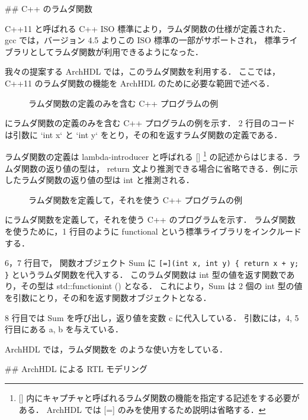 ## C++ のラムダ関数

C++11 と呼ばれる C++ ISO 標準により，ラムダ関数の仕様が定義された．
gcc では，バージョン 4.5 よりこの ISO 標準の一部がサポートされ，
標準ライブラリとしてラムダ関数が利用できるようになった．

我々の提案する ArchHDL では，このラムダ関数を利用する．
ここでは，C++11 のラムダ関数の機能を ArchHDL のために必要な範囲で述べる．

\begin{figure}[t]
 
 \caption{ラムダ関数の定義のみを含む C++ プログラムの例}
 \label{src:def_lambda}
\end{figure}

 にラムダ関数の定義のみを含む C++ プログラムの例を示す．
2 行目のコードは引数に `int x` と `int y` をとり，その和を返すラムダ関数の定義である．

ラムダ関数の定義は lambda-introducer と呼ばれる [] \footnote{
[] 内にキャプチャと呼ばれるラムダ関数の機能を指定する記述をする必要がある．
ArchHDL では [=] のみを使用するため説明は省略する．
}
の記述からはじまる．ラムダ関数の返り値の型は，
return 文より推測できる場合に省略できる．例に示したラムダ関数の返り値の型は
int と推測される．

\begin{figure}[t]
 
 \caption{ラムダ関数を定義して，それを使う C++ プログラムの例}
 \label{src:ex_lambda}
\end{figure}

 にラムダ関数を定義して，それを使う C++ のプログラムを示す．
ラムダ関数を使うために，1 行目のように functional という標準ライブラリをインクルードする．

6，7 行目で， 関数オブジェクト Sum に
\verb`[=](int x, int y) { return x + y; }`
というラムダ関数を代入する．
このラムダ関数は int 型の値を返す関数であり，その型は std::function\<int ()\> となる．
これにより，Sum は 2 個の int 型の値を引数にとり，その和を返す関数オブジェクトとなる．

8 行目では Sum を呼び出し，返り値を変数 c に代入している．
引数には，4, 5 行目にある a, b を与えている．

ArchHDL では，ラムダ関数を  のような使い方をしている．

\fi

## ArchHDL による RTL モデリング \label{ss:modeling}



